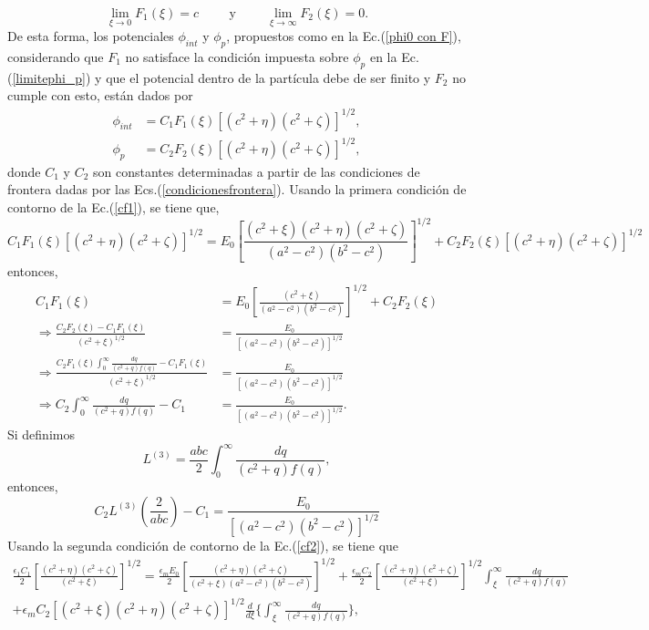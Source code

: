 \begin{equation}
    \lim_{\xi \to 0}F_1(\xi)=c\hspace{1cm}\mbox{y}\hspace{1cm} \lim_{\xi \to \infty}F_2(\xi)=0.
\end{equation}
De esta forma, los potenciales $\phi_{int}$ y $\phi_p$, propuestos como en la Ec.(\ref{phi0 con F}), considerando que $F_1$ no satisface la condición impuesta sobre $\phi_p$ en la Ec. (\ref{limitephi_p}) y que el potencial dentro de la partícula debe de ser finito y $F_2$ no cumple con esto, están dados por
\begin{align}
    \phi_{int}&=C_1F_1(\xi)[(c^2+\eta)(c^2+\zeta)]^{1/2}\label{phi_int},\\
    \phi_p&=C_2F_2(\xi)[(c^2+\eta)(c^2+\zeta)]^{1/2}\label{phi_p},
\end{align}
donde $C_1$ y $C_2$ son constantes determinadas a partir de las condiciones de frontera dadas por las Ecs.(\ref{condicionesfrontera}). Usando la primera condición de contorno de la Ec.(\ref{cf1}), se tiene que,
\begin{equation}
    C_1F_1(\xi)[(c^2+\eta)(c^2+\zeta)]^{1/2}=E_0\left[\frac{(c^2+\xi)(c^2+\eta)(c^2+\zeta)}{(a^2-c^2)(b^2-c^2)}\right]^{1/2}+C_2F_2(\xi)[(c^2+\eta)(c^2+\zeta)]^{1/2}
\end{equation}
entonces, 
\begin{align}
    C_1F_1(\xi)&=E_0\left[\frac{(c^2+\xi)}{(a^2-c^2)(b^2-c^2)}\right]^{1/2}+C_2F_2(\xi)\nonumber\\
    \Rightarrow \frac{C_2F_2(\xi)-C_1F_1(\xi)}{(c^2+\xi)^{1/2}}&=\frac{E_0}{[(a^2-c^2)(b^2-c^2)]^{1/2}}\nonumber\\
    \Rightarrow \frac{C_2 F_1(\xi)\int_{0}^{\infty}\frac{dq}{(c^2+q)f(q)}-C_1F_1(\xi)}{(c^2+\xi)^{1/2}}&=\frac{E_0}{[(a^2-c^2)(b^2-c^2)]^{1/2}}\nonumber\\
    \Rightarrow C_2 \int_{0}^{\infty}\frac{dq}{(c^2+q)f(q)}-C_1&=\frac{E_0}{[(a^2-c^2)(b^2-c^2)]^{1/2}}.
\end{align}
Si definimos
\begin{equation}
    L^{(3)}=\frac{abc}{2}\int_{0}^{\infty}\frac{dq}{(c^2+q)f(q)},
\end{equation}
entonces,
\begin{equation}
    C_2L^{(3)}\left(\frac{2}{abc}\right)-C_1=\frac{E_0}{[(a^2-c^2)(b^2-c^2)]^{1/2}}
    \label{ec1 de cf}
\end{equation}
Usando la segunda condición de contorno de la Ec.(\ref{cf2}), se tiene que
\begin{multline*}
    \frac{\epsilon_1C_1}{2}\left[\frac{(c^2+\eta)(c^2+\zeta)}{(c^2+\xi)}\right]^{1/2}=\frac{\epsilon_mE_0}{2}\left[\frac{(c^2+\eta)(c^2+\zeta)}{(c^2+\xi)(a^2-c^2)(b^2-c^2)}\right]^{1/2}+\frac{\epsilon_m C_2}{2}\left[\frac{(c^2+\eta)(c^2+\zeta)}{(c^2+\xi)}\right]^{1/2}\int_{\xi}^{\infty}\frac{dq}{(c^2+q)f(q)}\\
    +\epsilon_mC_2[(c^2+\xi)(c^2+\eta)(c^2+\zeta)]^{1/2}\frac{d}{d\xi}\Bigg\{\int_{\xi}^{\infty}\frac{dq}{(c^2+q)f(q)}\Bigg\},
\end{multline*}
